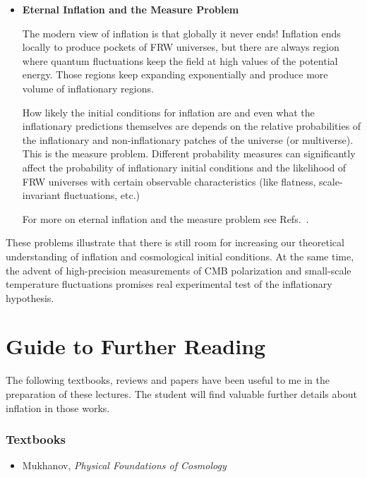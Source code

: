 \documentclass[12pt,letterpaper,rotate]{article}
\begin{document}
{\begin{itemize}
\item {\bf Eternal Inflation and the Measure Problem}

The modern view of inflation is that globally it never ends!
Inflation ends locally to produce pockets of FRW universes, but there are always region where quantum fluctuations keep the field at high values of the potential energy.
Those regions keep expanding exponentially and produce more volume of inflationary regions.

How likely the initial conditions for inflation are and even what the inflationary predictions themselves are depends on the relative probabilities of the inflationary and non-inflationary patches of the universe (or multiverse). This is the measure problem.
Different probability measures can significantly affect the probability of inflationary initial conditions and the likelihood of FRW universes with certain observable characteristics (like flatness, scale-invariant fluctuations, etc.)

For more on eternal inflation and the measure problem see Refs.~\cite{Vilenkin:1983xq, Linde:1986fd, Linde:1993nz, Linde:1993xx, GarciaBellido:1993wn,Vilenkin:1994ua, Garriga:2005av, Bousso:2006ev, Linde:2007nm, Bousso:2008hz, DeSimone:2008if, Garriga:2008ks, Winitzki:2008jp, Linde:2008xf}.

\end{itemize}

These problems illustrate that there is still room for increasing our theoretical understanding of inflation and cosmological initial conditions.
At the same time, the advent of high-precision measurements of CMB polarization and small-scale temperature fluctuations promises real experimental test of the inflationary hypothesis.


\newpage
\section{Guide to Further Reading}

The following textbooks, reviews and papers have been useful to me in the preparation of these lectures.
The student will find valuable further details about inflation in those works.


\subsubsection*{Textbooks}

\begin{itemize}
\item Mukhanov, {\it Physical Foundations of Cosmology}


\end{itemize}}
\end{document}
